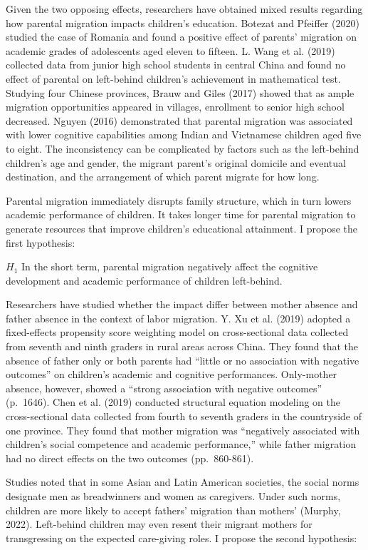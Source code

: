 \documentclass[
  man,floatsintext]{apa7}
\begin{document}
Given the two opposing effects, researchers have obtained mixed results regarding how parental migration impacts children's education. Botezat and Pfeiffer (2020) studied the case of Romania and found a positive effect of parents' migration on academic grades of adolescents aged eleven to fifteen. L. Wang et al. (2019) collected data from junior high school students in central China and found no effect of parental on left-behind children's achievement in mathematical test. Studying four Chinese provinces, Brauw and Giles (2017) showed that as ample migration opportunities appeared in villages, enrollment to senior high school decreased. Nguyen (2016) demonstrated that parental migration was associated with lower cognitive capabilities among Indian and Vietnamese children aged five to eight. The inconsistency can be complicated by factors such as the left-behind children's age and gender, the migrant parent's original domicile and eventual destination, and the arrangement of which parent migrate for how long.

Parental migration immediately disrupts family structure, which in turn lowers academic performance of children. It takes longer time for parental migration to generate resources that improve children's educational attainment. I propose the first hypothesis:

\(H_1\) In the short term, parental migration negatively affect the cognitive development and academic performance of children left-behind.

Researchers have studied whether the impact differ between mother absence and father absence in the context of labor migration. Y. Xu et al. (2019) adopted a fixed-effects propensity score weighting model on cross-sectional data collected from seventh and ninth graders in rural areas across China. They found that the absence of father only or both parents had ``little or no association with negative outcomes'' on children's academic and cognitive performances. Only-mother absence, however, showed a ``strong association with negative outcomes'' (p.~1646). Chen et al. (2019) conducted structural equation modeling on the cross-sectional data collected from fourth to seventh graders in the countryside of one province. They found that mother migration was ``negatively associated with children's social competence and academic performance,'' while father migration had no direct effects on the two outcomes (pp.~860-861).

Studies noted that in some Asian and Latin American societies, the social norms designate men as breadwinners and women as caregivers. Under such norms, children are more likely to accept fathers' migration than mothers' (Murphy, 2022). Left-behind children may even resent their migrant mothers for transgressing on the expected care-giving roles. I propose the second hypothesis:
\end{document}
